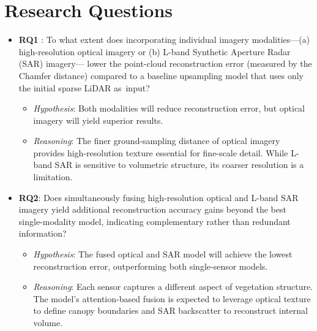\documentclass[12pt]{report}
\begin{document}
\section{Research Questions}
\begin{itemize}
  \item \textbf{RQ1}
: To what extent does incorporating individual imagery modalities---(a) high-resolution optical imagery or (b) L-band Synthetic Aperture Radar (SAR) imagery---
lower the point-cloud reconstruction error (measured by the Chamfer distance) compared to a baseline upsampling model that uses only the initial sparse LiDAR \mbox{as input}?
        \begin{itemize}
          \item \textit{Hypothesis}: Both modalities will reduce reconstruction error, but optical imagery will yield superior results.
          \item \textit{Reasoning}: The finer ground-sampling distance of optical imagery provides high-resolution texture essential for fine-scale detail. While L-band SAR is sensitive to volumetric structure, its coarser resolution is a limitation.
        \end{itemize}

  \item \textbf{RQ2}: Does simultaneously fusing high-resolution optical and L-band SAR imagery yield additional reconstruction accuracy gains beyond the best single-modality model, indicating complementary rather than redundant information?
        \begin{itemize}
          \item \textit{Hypothesis}: The fused optical and SAR model will achieve the lowest reconstruction error, outperforming both single-sensor models.
          \item \textit{Reasoning}: Each sensor captures a different aspect of vegetation structure. The model's attention-based fusion is expected to leverage optical texture to define canopy boundaries and SAR backscatter to reconstruct internal volume.
        \end{itemize}


\end{itemize}
\end{document}
